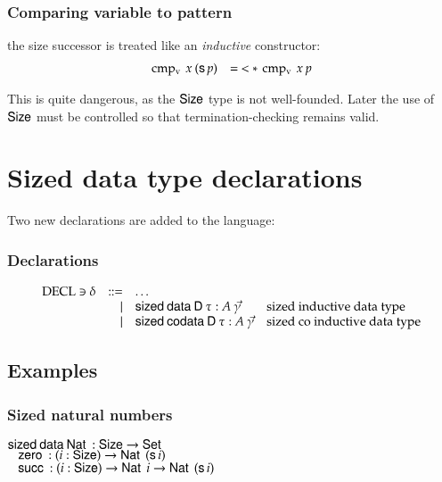 \subsubsection{Comparing variable to pattern}
the size successor is treated like an \emph{inductive} constructor:
\[
\begin{array}[t]{ll}
\operatorname{cmp_v} \: x \: (\mathsf{s}\, p) & = \: < * \: \operatorname{cmp_v} \: x \: p\\
\end{array}
\]

This is quite dangerous, as the $\mathsf{Size}$ type is not well-founded.
Later the use of $\mathsf{Size}$ must be controlled so that termination-checking remains valid.

\section{Sized data type declarations}

\newcommand{\sizecon}[4]{#1\vdash#2\mbox{ \textbf{sizeCon} }#3\:#4}
\newcommand{\sizeuse}[4]{#1\vdash#2\mbox{ \textbf{sizeUse} }#3\:#4}

Two new declarations are added to the language:
\subsubsection{Declarations}
\[
\begin{array}{lrll}
\operatorname{DECL} \ni \delta & ::= & \ldots & \\
& \mid & \mathsf{sized}\: \mathsf{data}\: \mathsf{D} \: \tau : A \: \vec{\gamma} & \mbox{sized inductive data type}\\ 
& \mid & \mathsf{sized}\: \mathsf{codata}\: \mathsf{D} \: \tau : A \: \vec{\gamma} & \mbox{sized co inductive data type} \\
\end{array}
\]

\subsection{Examples}


\subsubsection{Sized natural numbers}

\begin{bsp}
$\mathsf{sized}\: \mathsf{data}\: \mathsf{Nat}\: : \mathsf{Size} \rightarrow \mathsf{Set} $ \\
$\hspace*{3mm} \mathsf{zero}\: : ( i : \mathsf{Size} ) \rightarrow{ \mathsf{Nat}\:\: (\mathsf{s}\,i)} $\\
$\hspace*{3mm} \mathsf{succ}\: : ( i : \mathsf{Size} ) \rightarrow{ \mathsf{Nat}\:\: i \rightarrow\mathsf{Nat}\:\: (\mathsf{s}\,i)} $
\end{bsp}

